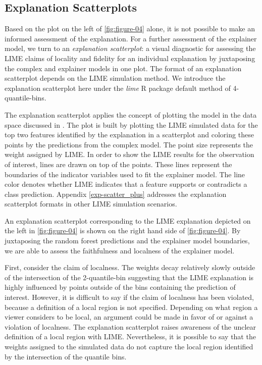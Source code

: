 \documentclass[AMS,STIX2COL]{WileyNJD-v2}\usepackage[]{graphicx}\usepackage[]{color}
\begin{document}
\subsection{Explanation Scatterplots} \label{exp-scatter}

Based on the plot on the left of \autoref{fig:figure-04} alone, it is not possible to make an informed assessment of the explanation. For a further assessment of the explainer model, we turn to an \emph{explanation scatterplot}: a visual diagnostic for assessing the LIME claims of locality and fidelity for an individual explanation by juxtaposing the complex and explainer models in one plot. The format of an explanation scatterplot depends on the LIME simulation method. We introduce the explanation scatterplot here under the \emph{lime} R package default method of 4-quantile-bins.

The explanation scatterplot applies the concept of plotting the model in the data space discussed in \citet{wickham:2015}. The plot is built by plotting the LIME simulated data for the top two features identified by the explanation in a scatterplot and coloring these points by the predictions from the complex model. The point size represents the weight assigned by LIME. In order to show the LIME results for the observation of interest, lines are drawn on top of the points. These lines  represent the boundaries of the indicator variables used to fit the explainer model. The line color  denotes whether LIME indicates that a feature supports or contradicts a class prediction. Appendix \ref{exp-scatter_plus} addresses the explanation scatterplot formats in other LIME simulation scenarios.

An explanation scatterplot corresponding to the LIME explanation depicted on the left in \autoref{fig:figure-04} is shown on the right hand side of \autoref{fig:figure-04}. By juxtaposing the random forest predictions and the explainer model boundaries, we are able to assess the faithfulness and localness of the explainer model. 

First, consider the claim of localness. The weights decay relatively slowly outside of the intersection of the 2-quantile-bin suggesting that the LIME explanation is highly influenced by points outside of the bins containing the prediction of interest. However, it is difficult to say if the claim of localness has been violated, because a definition of a local region is not specified. Depending on what region a viewer considers to be local, an argument could be made in favor of or against a violation of localness. The explanation scatterplot raises awareness of the unclear definition of a local region with LIME. Nevertheless, it is possible to say that the weights assigned to the simulated data do not capture  the local region identified by the intersection of the quantile bins. 
\end{document}
